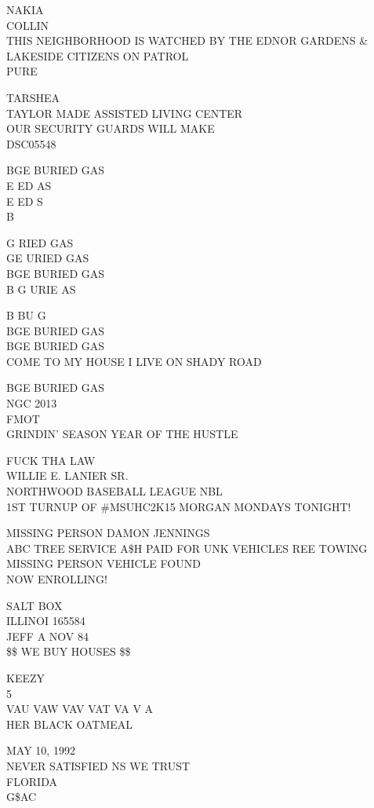 \documentclass[10pt,letterpaper]{article}
\begin{document}
NAKIA\\
COLLIN\\
THIS NEIGHBORHOOD IS WATCHED BY THE EDNOR GARDENS \& LAKESIDE CITIZENS ON PATROL\\
PURE

TARSHEA\\
TAYLOR MADE ASSISTED LIVING CENTER\\
OUR SECURITY GUARDS WILL MAKE\\
DSC05548

BGE BURIED GAS\\
E ED AS\\
E ED S\\
B

G RIED GAS\\
GE URIED GAS\\
BGE BURIED GAS\\
B G URIE AS

B BU G\\
BGE BURIED GAS\\
BGE BURIED GAS\\
COME TO MY HOUSE I LIVE ON SHADY ROAD

BGE BURIED GAS\\
NGC 2013\\
FMOT\\
GRINDIN' SEASON YEAR OF THE HUSTLE

FUCK THA LAW\\
WILLIE E. LANIER SR.\\
NORTHWOOD BASEBALL LEAGUE NBL\\
1ST TURNUP OF \#MSUHC2K15 MORGAN MONDAYS TONIGHT!

MISSING PERSON DAMON JENNINGS\\
ABC TREE SERVICE A\$H PAID FOR UNK VEHICLES REE TOWING\\
MISSING PERSON VEHICLE FOUND\\
NOW ENROLLING!

SALT BOX\\
ILLINOI 165584\\
JEFF A NOV 84\\
\$\$ WE BUY HOUSES \$\$

KEEZY\\
5\\
VAU VAW VAV VAT VA V A\\
HER BLACK OATMEAL

MAY 10, 1992\\
NEVER SATISFIED NS WE TRUST\\
FLORIDA\\
G\$AC
\end{document}
